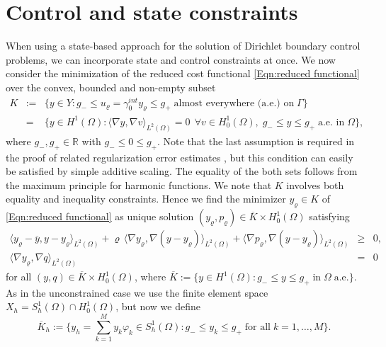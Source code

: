 \documentclass{article}
\numberwithin{equation}{section}
\begin{document}

\section{Control and state constraints}\label{Sec:Constraints}
When using a state-based approach for the solution of Dirichlet boundary
control problems, we can incorporate state and control constraints at once.
We now consider the minimization of the reduced cost functional 
\eqref{Eqn:reduced functional} over the convex, bounded and non-empty subset
\begin{eqnarray*}
  K & := & \Big \{ y \in Y : g_- \leq u_\varrho = \gamma_0^{int} y_\varrho
           \leq g_+ \; \mbox{almost everywhere (a.e.) on} \; \Gamma \Big 
           \} \\
    & = & \Big \{ y \in H^1(\Omega) :
          \langle \nabla y , \nabla v \rangle_{L^2(\Omega)} = 0 \;\,
          \forall v \in H^1_0(\Omega),\;
          g_- \leq y \leq g_+ \; \mbox{a.e. in} \; \Omega \Big \},
\end{eqnarray*}
where $g_-, g_+ \in \mathbb{R}$ with $g_- \le 0 \le g_+$. Note that the
last assumption is required in the proof of related regularization error
estimates \cite{GanglLoescherSteinbach:2025}, but this condition can easily
be satisfied by simple additive scaling. The equality of the both sets
follows from the maximum principle for harmonic functions. We note that $K$
involves both equality and inequality constraints. Hence we find the
minimizer $y_\varrho \in K$ of \eqref{Eqn:reduced functional} as unique
solution $(y_\varrho,p_\varrho) \in \overline{K} \times H^1_0(\Omega)$
satisfying
\[
  \begin{array}{lcl}
  \langle y_\varrho - \overline{y}, y - y_\varrho \rangle_{L^2(\Omega)} +
  \varrho \, \langle \nabla y_\varrho , \nabla (y- y_\varrho)
  \rangle_{L^2(\Omega)} +
  \langle \nabla p_\varrho , \nabla (y-y_\varrho) \rangle_{L^2(\Omega)}
  & \geq & 0, \\[2mm]
    \langle \nabla y_\varrho , \nabla q \rangle_{L^2(\Omega)} & = & 0
  \end{array}
\]
for all $(y,q) \in \overline{K} \times H^1_0(\Omega)$, where
$ \overline{K} := \{ y \in H^1(\Omega) : g_- \leq y \leq g_+ \;
\mbox{in} \; \Omega \; \mbox{a.e.} \}$.
As in the unconstrained case we use the finite element space
$X_h = S_h^1(\Omega) \cap H^1_0(\Omega)$, but now we define
\[
  \overline{K}_h := \Big \{ y_h =
  \sum\limits_{k=1}^M y_k \varphi_k \in S_h^1(\Omega) :
  g_- \leq y_k \leq g_+ \; \mbox{for all} \; k=1,\ldots,M \Big \}.
\]
\end{document}
